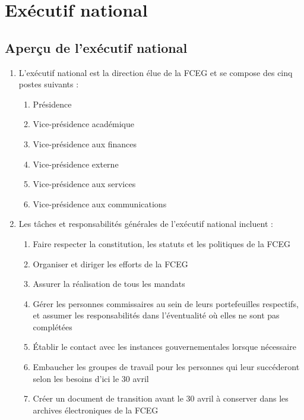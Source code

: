 \section{Exécutif national}
\label{executif-national}

\subsection{Aperçu de l'exécutif national}
\label{executif-national-apercu-de-l-executif-national}

\begin{enumerate}
 \item L'exécutif national est la direction élue de la FCEG et se compose des cinq postes suivants :
  \begin{enumerate}
   \item Présidence
   \item Vice-présidence académique
   \item Vice-présidence aux finances
   \item Vice-présidence externe
   \item Vice-présidence aux services
   \item Vice-présidence aux communications
  \end{enumerate}
 \item Les tâches et responsabilités générales de l'exécutif national incluent :
  \begin{enumerate}
   \item Faire respecter la constitution, les statuts et les politiques de la FCEG
   \item Organiser et diriger les efforts de la FCEG
   \item Assurer la réalisation de tous les mandats
   \item Gérer les personnes commissaires au sein de leurs portefeuilles respectifs, et assumer les responsabilités dans l'éventualité où elles ne sont pas complétées
   \item Établir le contact avec les instances gouvernementales lorsque nécessaire
   \item Embaucher les groupes de travail pour les personnes qui leur succéderont selon les besoins d'ici le 30 avril
   \item Créer un document de transition avant le 30 avril à conserver dans les archives électroniques de la FCEG
  \end{enumerate}
\end{enumerate}

